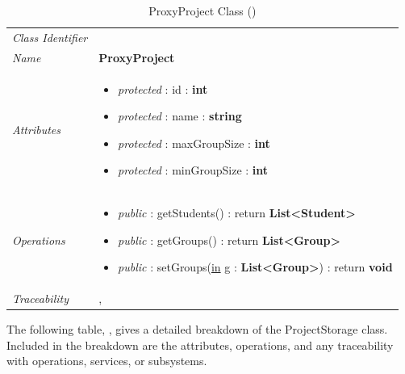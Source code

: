 \documentclass[12pt,letterpaper]{article}
\begin{document}
\begin{table}[H]
    \caption{ProxyProject Class ()} 
	\begin{tabu} to 
		\toprule
		Class Identifier &  \\
		Name & {\bf ProxyProject} \\
		Attributes & 
		\begin{minipage}[t]{\linewidth}
		    \begin{itemize}
		        \item \textit{protected} : id : {\bf int}
		        \item \textit{protected} : name : {\bf string}
		        \item \textit{protected} : maxGroupSize : {\bf int}
		        \item \textit{protected} : minGroupSize : {\bf int}
			\end{itemize}
	    \end{minipage} \\

		Operations &
		\begin{minipage}[t]{\linewidth}
			\begin{itemize}
			    \item {\it public} : getStudents() : return {\bf List<Student>}
			    \item {\it public} : getGroups() : return {\bf List<Group>}
			    \item {\it public} : setGroups(\underline{in} g : {\bf List<Group>}) : return {\bf void}
	        \end{itemize}
	    \end{minipage} \\
	    	Traceability & , \\
		\toprule
	\end{tabu}
\end{table}

The following table, , gives a detailed breakdown of the ProjectStorage class. Included in the breakdown are the attributes, operations, and any traceability with operations, services, or subsystems.
\end{document}
